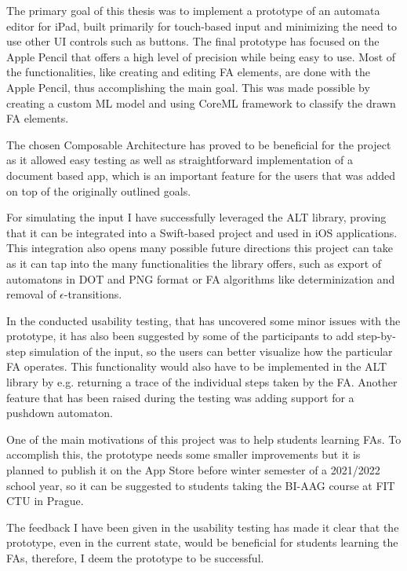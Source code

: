 The primary goal of this thesis was to implement a prototype of an automata editor for iPad, built primarily for touch-based input and minimizing the need to use other UI controls such as buttons. The final prototype has focused on the Apple Pencil that offers a high level of precision while being easy to use. Most of the functionalities, like creating and editing FA elements, are done with the Apple Pencil, thus accomplishing the main goal. This was made possible by creating a custom ML model and using CoreML framework to classify the drawn FA elements.

The chosen Composable Architecture has proved to be beneficial for the project as it allowed easy testing as well as straightforward implementation of a document based app, which is an important feature for the users that was added on top of the originally outlined goals.

For simulating the input I have successfully leveraged the ALT library, proving that it can be integrated into a Swift-based project and used in iOS applications. This integration also opens many possible future directions this project can take as it can tap into the many functionalities the library offers, such as export of automatons in DOT and PNG format or FA algorithms like determinization and removal of $\epsilon$-transitions.

In the conducted usability testing, that has uncovered some minor issues with the prototype, it has also been suggested by some of the participants to add step-by-step simulation of the input, so the users can better visualize how the particular FA operates. This functionality would also have to be implemented in the ALT library by e.g. returning a trace of the individual steps taken by the FA. Another feature that has been raised during the testing was adding support for a pushdown automaton.

One of the main motivations of this project was to help students learning FAs. To accomplish this, the prototype needs some smaller improvements but it is planned to publish it on the App Store before winter semester of a 2021/2022 school year, so it can be suggested to students taking the BI-AAG course at FIT CTU in Prague.

The feedback I have been given in the usability testing has made it clear that the prototype, even in the current state, would be beneficial for students learning the FAs, therefore, I deem the prototype to be successful.
